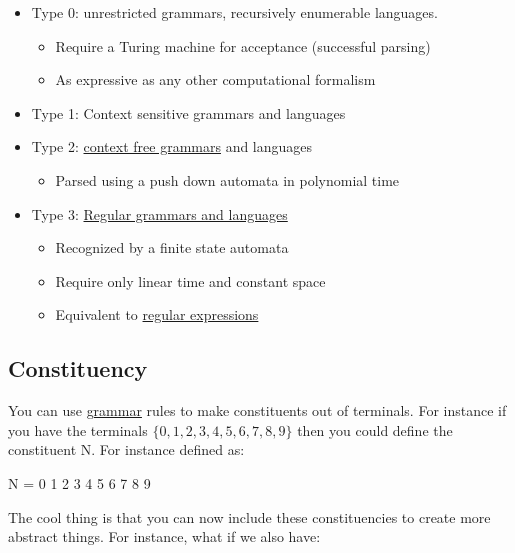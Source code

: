\documentclass[
  11pt,
  british,
]{article}
\providecommand{\tightlist}{%
  \setlength{\itemsep}{0pt}\setlength{\parskip}{0pt}}
\begin{document}
\begin{itemize}
\tightlist
\item
  Type 0: unrestricted grammars, recursively enumerable languages.

  \begin{itemize}
  \tightlist
  \item
    Require a Turing machine for acceptance (successful parsing)
  \item
    As expressive as any other computational formalism
  \end{itemize}
\item
  Type 1: Context sensitive grammars and languages
\item
  Type 2: \href{Context\%20free\%20grammars.md}{context free grammars}
  and languages

  \begin{itemize}
  \tightlist
  \item
    Parsed using a push down automata in polynomial time
  \end{itemize}
\item
  Type 3: \href{Regular\%20Languages.md}{Regular grammars and languages}

  \begin{itemize}
  \tightlist
  \item
    Recognized by a finite state automata
  \item
    Require only linear time and constant space
  \item
    Equivalent to \href{Regular\%20expression.md}{regular expressions}
  \end{itemize}
\end{itemize}

\hypertarget{constituency}{%
\subsection{Constituency}\label{constituency}}

You can use \href{Grammar.md}{grammar} rules to make constituents out of
terminals. For instance if you have the terminals
\(\{0,1,2,3,4,5,6,7,8,9\}\) then you could define the constituent N. For
instance defined as:

N = 0 \textbar{} 1 \textbar{} 2 \textbar{} 3 \textbar{} 4 \textbar{} 5
\textbar{} 6 \textbar{} 7 \textbar{} 8 \textbar{} 9

The cool thing is that you can now include these constituencies to
create more abstract things. For instance, what if we also have:
\end{document}
